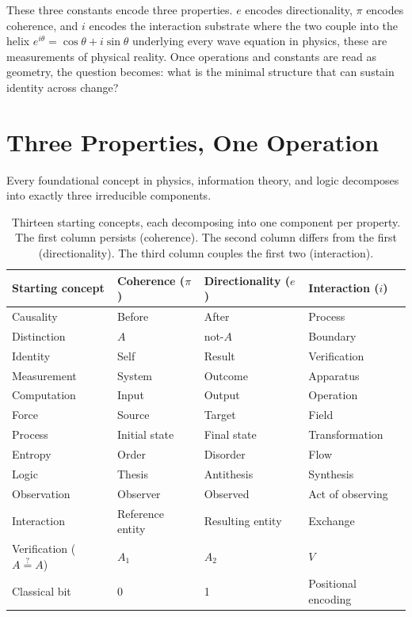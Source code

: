 \documentclass[12pt]{article}
\begin{document}
These three constants encode three properties. $e$ encodes directionality, $\pi$ encodes coherence, and $i$ encodes the interaction substrate where the two couple into the helix $e^{i\theta} = \cos\theta + i\sin\theta$ underlying every wave equation in physics, these are measurements of physical reality. Once operations and constants are read as geometry, the question becomes: what is the minimal structure that can sustain identity across change?


\section{Three Properties, One Operation}

Every foundational concept in physics, information theory, and logic decomposes into exactly three irreducible components.



\begin{table}[H]
\centering
\begin{tabular}{l l l l}
\toprule
\textbf{Starting concept} & \textbf{Coherence ($\pi$)} & \textbf{Directionality ($e$)} & \textbf{Interaction ($i$)} \\
\midrule
Causality & Before & After & Process \\
Distinction & $A$ & not-$A$ & Boundary \\
Identity & Self & Result & Verification \\
Measurement & System & Outcome & Apparatus \\
Computation & Input & Output & Operation \\
Force & Source & Target & Field \\
Process & Initial state & Final state & Transformation \\
Entropy & Order & Disorder & Flow \\
Logic & Thesis & Antithesis & Synthesis \\
Observation & Observer & Observed & Act of observing \\
Interaction & Reference entity & Resulting entity & Exchange \\
Verification ($A \stackrel{?}{=} A$) & $A_1$ & $A_2$ & $V$ \\
Classical bit & 0 & 1 & Positional encoding \\
\bottomrule
\end{tabular}
\caption{Thirteen starting concepts, each decomposing into one component per property. The first column persists (coherence). The second column differs from the first (directionality). The third column couples the first two (interaction).}
\label{tab:triad}
\end{table}
\end{document}
